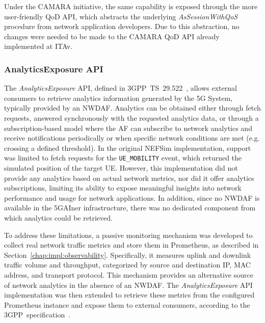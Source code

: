 Under the CAMARA initiative, the same capability is exposed through the more user-friendly \acs{QoD} \acs{API}, which abstracts the underlying \textit{AsSessionWithQoS} procedure from network application developers. Due to this abstraction, no changes were needed to be made to the CAMARA \acs{QoD} \acs{API} already implemented at \acs{ITAv}.

\subsubsection{AnalyticsExposure \acs{API}}
\label{chap:impl:exposure:nef:AnalyticsExposure}

The \textit{AnalyticsExposure} \acs{API}, defined in \acs{3GPP}~TS~29.522~\cite{ETSI_TS_129_522_V18_11_0}, allows external consumers to retrieve analytics information generated by the \acs{5G} System, typically provided by an \acs{NWDAF}. Analytics can be obtained either through fetch requests, answered synchronously with the requested analytics data, or through a subscription-based model where the \acs{AF} can subscribe to network analytics and receive notifications periodically or when specific network conditions are met (e.g. crossing a defined threshold). In the original \acs{NEF}Sim implementation, support was limited to fetch requests for the \texttt{UE\_MOBILITY} event, which returned the simulated position of the target \acs{UE}. However, this implementation did not provide any analytics based on actual network metrics, nor did it offer analytics subscriptions, limiting its ability to expose meaningful insights into network performance and usage for network applications. In addition, since no \acs{NWDAF} is available in the 5GAIner infrastructure, there was no dedicated component from which analytics could be retrieved.

To address these limitations, a passive monitoring mechanism was developed to collect real network traffic metrics and store them in Prometheus, as described in Section~\ref{chap:impl:observability}. Specifically, it measures uplink and downlink traffic volume and throughput, categorized by source and destination \acs{IP}, \acs{MAC} address, and transport protocol. This mechanism provides an alternative source of network analytics in the absence of an \acs{NWDAF}. The \textit{AnalyticsExposure} \acs{API} implementation was then extended to retrieve these metrics from the configured Prometheus instance and expose them to external consumers, according to the \acs{3GPP}~specification~\cite{ETSI_TS_129_522_V18_11_0}.


